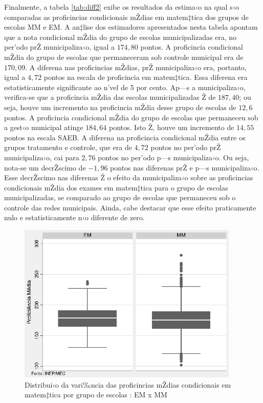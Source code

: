 \documentclass[a4paper, 12pt]{article}
\begin{document}
Finalmente, a tabela \ref{tab:diff2} exibe os resultados da estima‹o na qual s‹o comparadas as proficincias condicionais mŽdias em matem‡tica dos grupos de escolas MM e EM. A an‡lise dos estimadores apresentados nesta tabela apontam que a nota condicional mŽdia do grupo de escolas municipalizadas era, no per’odo prŽ municipaliza‹o, igual a $174,80$ pontos. A proficincia condicional mŽdia do grupo de escolas que permaneceram sob controle municipal era de $170,09$. A diferena nas proficincias mŽdias, prŽ municipaliza‹o era, portanto, igual a $4,72$ pontos na escala de proficincia em matem‡tica. Essa diferena era estatisticamente significante ao n’vel de 5 por cento. Ap—s a municipaliza‹o, verifica-se que a proficincia mŽdia das escolas municipalizadas Ž de $187,40$; ou seja, houve um incremento na proficincia mŽdia desse grupo de escolas de $12,6$ pontos. A proficincia condicional mŽdia do grupo de escolas que permaneceu sob a gest‹o municipal atinge $184,64$ pontos. Isto Ž, houve um incremento de $14,55$ pontos na escala SAEB. A diferena na proficincia condicional mŽdia entre os grupos tratamento e controle, que era de $4,72$ pontos no per’odo prŽ municipaliza‹o, cai para $2,76$ pontos no per’odo p—s municipaliza‹o. Ou seja, nota-se um decrŽscimo de $-1,96$ pontos nas diferenas prŽ e p—s municipaliza‹o. Esse decrŽscimo nas diferenas Ž o efeito da municipaliza‹o sobre as proficincias condicionais mŽdia dos exames em matem‡tica para o grupo de escolas municipalizadas, se comparado ao grupo de escolas que permaneceu sob o controle das redes municipais. Ainda, cabe destacar que esse efeito praticamente nulo e estatisticamente n‹o diferente de zero.  


\vspace*{1cm} 

\begin{figure}[h]
\centering
\begin{footnotesize}
\caption{Distribui‹o da vari‰ncia das proficincias mŽdias condicionais em matem‡tica por grupo de escolas : EM x MM} \label{fig:EMMM}                             
 \includegraphics[height=3in]{EMMM}
\end{footnotesize}
\end{figure}
 
\end{document}
